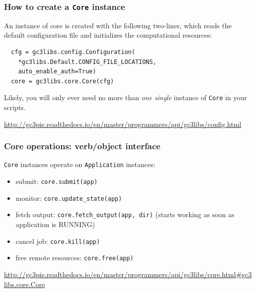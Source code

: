 \documentclass[english,serif,mathserif,xcolor=pdftex,dvipsnames,table]{beamer}
\begin{document}
\begin{frame}[fragile]
  \frametitle{How to create a \texttt{Core} instance}
  An instance of core is created with the following two-liner, which
  reads the default configuration file and initializes the
  computational resources:
\begin{lstlisting}
  cfg = gc3libs.config.Configuration(
    *gc3libs.Default.CONFIG_FILE_LOCATIONS,
    auto_enable_auth=True)
  core = gc3libs.core.Core(cfg)
\end{lstlisting}

\+
Likely, you will only ever need no more than \emph{one single}
instance of \texttt{Core} in your scripts.

\+
\begin{references}
  \url{http://gc3pie.readthedocs.io/en/master/programmers/api/gc3libs/config.html}
\end{references}
\end{frame}


\begin{frame}[fragile]
\frametitle{Core operations: verb/object interface}

\texttt{Core} instances operate on \texttt{Application} instances:
\begin{itemize}
\item submit: \texttt{core.submit(app)}
\item monitor: \texttt{core.update\_state(app)}
\item fetch output: \texttt{core.fetch\_output(app, dir)} (starts working as soon as
    application is RUNNING)
\item cancel job: \texttt{core.kill(app)}
\item free remote resources: \texttt{core.free(app)}
\end{itemize}

\+
\begin{references}
  \url{http://gc3pie.readthedocs.io/en/master/programmers/api/gc3libs/core.html#gc3libs.core.Core}
\end{references}
\end{frame}
\end{document}
